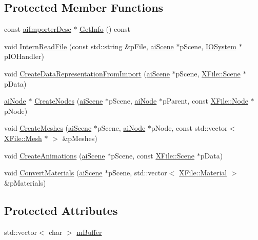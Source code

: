 \subsection*{Protected Member Functions}
\begin{DoxyCompactItemize}
\item 
const \hyperlink{structai_importer_desc}{ai\+Importer\+Desc} $\ast$ \hyperlink{class_assimp_1_1_x_file_importer_aba3e78d75128b02d9c961131a06605cc}{Get\+Info} () const 
\item 
void \hyperlink{class_assimp_1_1_x_file_importer_a062ed9f5fdca14e89bc40a5d4990dc4d}{Intern\+Read\+File} (const std\+::string \&p\+File, \hyperlink{structai_scene}{ai\+Scene} $\ast$p\+Scene, \hyperlink{class_assimp_1_1_i_o_system}{I\+O\+System} $\ast$p\+I\+O\+Handler)
\item 
void \hyperlink{class_assimp_1_1_x_file_importer_a8469386c3fad0cea492366faa471928f}{Create\+Data\+Representation\+From\+Import} (\hyperlink{structai_scene}{ai\+Scene} $\ast$p\+Scene, \hyperlink{struct_assimp_1_1_x_file_1_1_scene}{X\+File\+::\+Scene} $\ast$p\+Data)
\item 
\hyperlink{structai_node}{ai\+Node} $\ast$ \hyperlink{class_assimp_1_1_x_file_importer_ab114dd63712b166d6357831cca52c40f}{Create\+Nodes} (\hyperlink{structai_scene}{ai\+Scene} $\ast$p\+Scene, \hyperlink{structai_node}{ai\+Node} $\ast$p\+Parent, const \hyperlink{struct_assimp_1_1_x_file_1_1_node}{X\+File\+::\+Node} $\ast$p\+Node)
\item 
void \hyperlink{class_assimp_1_1_x_file_importer_a64bc626aa09647e73fa8eb65bffeb892}{Create\+Meshes} (\hyperlink{structai_scene}{ai\+Scene} $\ast$p\+Scene, \hyperlink{structai_node}{ai\+Node} $\ast$p\+Node, const std\+::vector$<$ \hyperlink{struct_assimp_1_1_x_file_1_1_mesh}{X\+File\+::\+Mesh} $\ast$ $>$ \&p\+Meshes)
\item 
void \hyperlink{class_assimp_1_1_x_file_importer_a5febf1d1cb60b0e8c51be8435ce0821d}{Create\+Animations} (\hyperlink{structai_scene}{ai\+Scene} $\ast$p\+Scene, const \hyperlink{struct_assimp_1_1_x_file_1_1_scene}{X\+File\+::\+Scene} $\ast$p\+Data)
\item 
void \hyperlink{class_assimp_1_1_x_file_importer_a42582aba2686f42fc445004ffcf262df}{Convert\+Materials} (\hyperlink{structai_scene}{ai\+Scene} $\ast$p\+Scene, std\+::vector$<$ \hyperlink{struct_assimp_1_1_x_file_1_1_material}{X\+File\+::\+Material} $>$ \&p\+Materials)
\end{DoxyCompactItemize}
\subsection*{Protected Attributes}
\begin{DoxyCompactItemize}
\item 
std\+::vector$<$ char $>$ \hyperlink{class_assimp_1_1_x_file_importer_a0fbc700f85f2567ff81b68eb8af0dc99}{m\+Buffer}
\end{DoxyCompactItemize}
